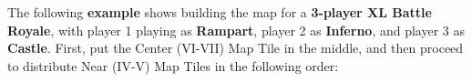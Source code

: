 The following \textbf{example} shows building the map for a \textbf{3-player XL Battle Royale}, with player 1 playing as \textcolor{rampartbg}{\textbf{Rampart}}, player 2 as \textcolor{infernobg}{\textbf{Inferno}}, and player 3 as \textcolor{castlebg}{\textbf{Castle}}.
First, put the Center (VI-VII) Map Tile in the middle, and then proceed to distribute Near (IV-V) Map Tiles in the following order:

\bigskip

\newcommand{\playerimage}[2]{%
  \begin{minipage}[t]{0.28\textwidth} %
    \centering
    \texttt{[image: \#1]} %
    \captionof{figure}{\large\textbf{#2}}
  \end{minipage}%
}

\newcommand{\playerarrow}[4]{%
  \tikz[remember picture, overlay, baseline=(current bounding box.base)] {
    \coordinate (here) at (0,0);
    \draw[-Triangle, ultra thick, #4, opacity=0.8]
      ([shift={(#1,#2)}]here) -- ++({#3}:0.8cm);
  }%
}

